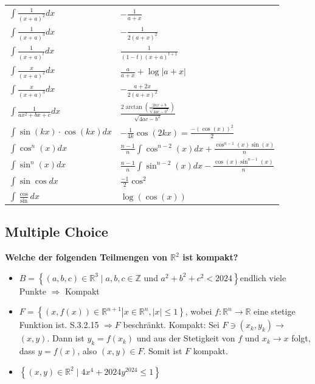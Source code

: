 \begin{flushleft}
\begin{center}
\begin{tabularx}{\linewidth}{>{\centering\arraybackslash}X>{\centering\arraybackslash}X}
   
   
   
  $\int \frac{1}{(x+a)^2}dx$& $-\frac{1}{a+x}$ \\
$\int \frac{1}{(x+a)^3}dx$& $-\frac{1}{2(a+x)^2}$ \\
$\int \frac{1}{(x+a)^t}dx$& $\frac{1}{(1-t)(x+a)^{t+1}}$ \\
$\int \frac{x}{(x+a)^2}dx$& $\frac{a}{a+x}+\log |a+x|$ \\
$\int \frac{x}{(x+a)^3}dx$& $-\frac{a+2x}{2(a+x)^2}$ \\
$\int \frac{1}{ax^2+bx+c}dx$& $\frac{2 \arctan\left(\frac{2ax+b}{\sqrt{4ac-b^2}} \right)}{\sqrt{4ac-b^2}}$\\

  $\int \sin(kx)\cdot \cos(kx)dx$ & $-\frac{1}{4k}\cos(2kx)=\frac{-(\cos(x))^2}{2}$\\
  


 $\int \cos^n(x) d x$ & $\frac{n-1}{n} \int \cos^{n-2}(x) d x+\frac{\cos^{n-1}(x) \sin (x)}{n}$ \\
$ \int \sin^n(x) d x $ & $\frac{n-1}{n} \int \sin ^{n-2}(x) d x-\frac{\cos (x) \sin ^{n-1}(x)}{n}$\\


$\int \sin \cos dx$ & $\frac{-1}{2}\cos^2$\\
  $\int \frac{\cos}{ \sin} dx$ & $\log(\cos(x))$\\
  
  \bottomrule
 \end{tabularx}
\end{center}




\subsection{Multiple Choice}


\scriptsize

\textbf{Welche der folgenden Teilmengen von $\mathbb{R}^2$ ist kompakt?}

\begin{itemize}[leftmargin = *]
\item[\textcolor{green}{W}] $B=\left\{(a, b, c) \in \mathbb{R}^3 \mid a, b, c \in \mathbb{Z}\right.$ und $\left.a^2+b^2+c^2<2024\right\}$\textcolor{Emerald}{endlich viele Punkte $\Rightarrow$ Kompakt}
\item[\textcolor{green}{W}] $F=\left\{(x, f(x)) \in \mathbb{R}^{n+1}\left|x \in \mathbb{R}^n,|x| \leq 1\right\}\right.$, wobei $f: \mathbb{R}^n \rightarrow \mathbb{R}$ eine stetige Funktion ist. \textcolor{Emerald}{S.3.2.15 $\Rightarrow F $ beschränkt. Kompakt: Sei $F \ni\left(x_k, y_k\right) \rightarrow$ $(x, y)$. Dann ist $y_k=f\left(x_k\right)$ und aus der Stetigkeit von $f$ und $x_k \rightarrow x$ folgt, dass $y=f(x)$, also $(x, y) \in F$. Somit ist $F$ kompakt.}
\item[\textcolor{green}{W}] $\left\{(x, y) \in \mathbb{R}^2 \mid 4 x^4+2024 y^{2024} \leq 1\right\}$  


\end{itemize}
\end{flushleft}
